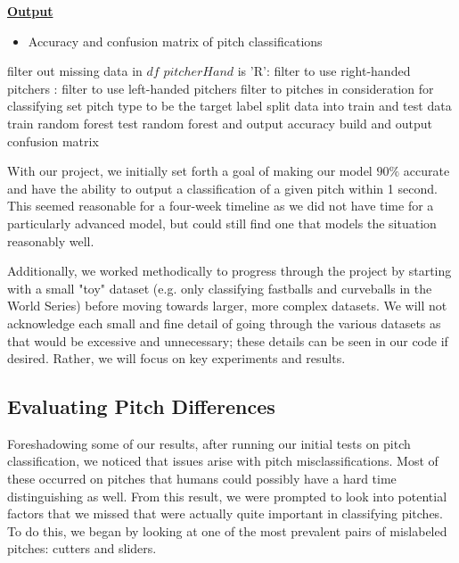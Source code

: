 \documentclass{article}
\begin{document}
\textbf{\underline{Output}}

\begin{itemize}[noitemsep]
  \item Accuracy and confusion matrix of pitch classifications
\end{itemize}

\begin{codebox}
  \li filter out missing data in $df$
  \li \If $pitcherHand$ is 'R': \Then
  \li filter to use right-handed pitchers
  \End
  \li \Else: \Then
  \li filter to use left-handed pitchers
  \End
  \li filter to pitches in consideration for classifying
  \li set pitch type to be the target label
  \li split data into train and test data
  \li train random forest
  \li test random forest and output accuracy
  \li build and output confusion matrix
\end{codebox}

With our project, we initially set forth a goal of making our model $90\%$ accurate and have the 
ability to output a classification of a given pitch within 1 second. This seemed reasonable 
for a four-week timeline as we did not have time for a particularly advanced model, but could 
still find one that models the situation reasonably well. 

Additionally, we worked methodically to progress through the project by starting with a small "toy" 
dataset (e.g. only classifying fastballs and curveballs in the World Series) before moving 
towards larger, more complex datasets. We will not acknowledge each small and fine detail 
of going through the various datasets as that would be excessive and unnecessary; these details 
can be seen in our code if desired. Rather, we will focus on key experiments and results.

\subsection{Evaluating Pitch Differences}
\label{pitchdiff}

Foreshadowing some of our results, after running our initial tests on pitch classification, 
we noticed that issues arise with pitch misclassifications. Most of these occurred on pitches 
that humans could possibly have a hard time distinguishing as well. From this result, we were 
prompted to look into potential factors that we missed that were actually quite important in 
classifying pitches. To do this, we began by looking at one of the most prevalent pairs 
of mislabeled pitches: cutters and sliders.
\end{document}

